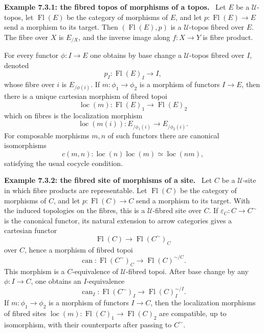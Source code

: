 \documentclass[11pt]{article}
\newcommand{\U}{\mathcal{U}}
\newcommand{\can}{\operatorname{can}}
\newcommand{\loc}{\operatorname{loc}}
\newcommand{\Fl}{\operatorname{Fl}}
\newenvironment{remarktext}[1]{\par\medskip\noindent\textbf{#1.}\ }{\par\medskip}
\begin{document}
\begin{remarktext}{Example 7.3.1: the fibred topos of morphisms of a topos}
Let \(E\) be a \(\U\)-topos, let \(\Fl(E)\) be the category of morphisms of \(E\), and let \(p:\Fl(E)\to E\) send a morphism to its target. Then \((\Fl(E),p)\) is a \(\U\)-topos fibred over \(E\). The fibre over \(X\) is \(E_{/X}\), and the inverse image along \(f:X\to Y\) is fibre product.

For every functor \(\phi:I\to E\) one obtains by base change a \(\U\)-topos fibred over \(I\), denoted
\[
 p_I:\Fl(E)_I\to I, \tag{7.3.1.1}
\]
whose fibre over \(i\) is \(E_{/\phi(i)}\). If \(m:\phi_1\to\phi_2\) is a morphism of functors \(I\to E\), then there is a unique cartesian morphism of fibred topoi
\[
 \loc(m):\Fl(E)_1\to\Fl(E)_2 \tag{7.3.1.4}
\]
which on fibres is the localization morphism
\[
 \loc(m(i)):E_{/\phi_1(i)}\to E_{/\phi_2(i)}. \tag{7.3.1.3}
\]
For composable morphisms \(m,n\) of such functors there are canonical isomorphisms
\[
 c(m,n):\loc(n)\loc(m)\simeq\loc(nm), \tag{7.3.1.5}
\]
satisfying the usual cocycle condition.
\end{remarktext}

\begin{remarktext}{Example 7.3.2: the fibred site of morphisms of a site}
Let \(C\) be a \(\U\)-site in which fibre products are representable. Let \(\Fl(C)\) be the category of morphisms of \(C\), and let \(p:\Fl(C)\to C\) send a morphism to its target. With the induced topologies on the fibres, this is a \(\U\)-fibred site over \(C\). If \(\varepsilon_C:C\to C^{\sim}\) is the canonical functor, its natural extension to arrow categories gives a cartesian functor
\[
 \Fl(C)\to \Fl(C^{\sim})_C
\]
over \(C\), hence a morphism of fibred topoi
\[
 \can:\Fl(C^{\sim})_C\to\Fl(C)^{\sim/C}. \tag{7.3.2.3}
\]
This morphism is a \(C\)-equivalence of \(\U\)-fibred topoi. After base change by any \(\phi:I\to C\), one obtains an \(I\)-equivalence
\[
 \can_I:\Fl(C^{\sim})_I\to\Fl(C)^{\sim/I}_I. \tag{7.3.2.5}
\]
If \(m:\phi_1\to\phi_2\) is a morphism of functors \(I\to C\), then the localization morphisms of fibred sites \(\loc(m):\Fl(C)_1\to\Fl(C)_2\) are compatible, up to isomorphism, with their counterparts after passing to \(C^{\sim}\).
\end{remarktext}
\end{document}
